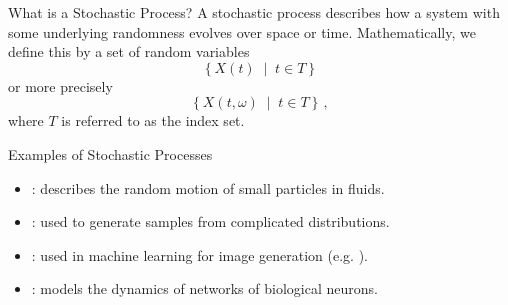 \documentclass[10pt]{beamer}
\begin{document}
\begin{frame}[fragile]{What is a Stochastic Process?}
A stochastic process describes how a system with some underlying randomness evolves over space or time. Mathematically, we define this by a set of random variables
\begin{equation*}
    \left\{X\left(t\right) \;\middle|\; t \in T\right\}
\end{equation*}
or more precisely
\begin{equation*}
    \left\{X\left(t, \omega\right) \;\middle|\; t \in T\right\}\,,
\end{equation*}
where \(T\) is referred to as the index set.\onslide<2->{

Very often, \(T\) is chosen to represent points in time. In discrete-time, we may have \(T = \mathbb{N}\), leading to a countably infinite set of random variables. In continuous-time, usually \(T = \left[0, \infty\right)\), producing an uncountably infinite set of random variables. Whether these random variables are independent or not is determined by the underlying process.}
\end{frame}

\begin{frame}[fragile]{Examples of Stochastic Processes}
\begin{itemize}[<+->]
    \item \href{https://en.wikipedia.org/wiki/Brownian_motion}{\color{mLightBrown}{Brownian motion}}: describes the random motion of small particles in fluids.
    \item \href{https://en.wikipedia.org/wiki/Markov_chain_Monte_Carlo}{\color{mLightBrown}{Markov chain Monte Carlo}}: used to generate samples from complicated distributions.
    \item \href{https://en.wikipedia.org/wiki/Diffusion_process}{\color{mLightBrown}{Diffusion processes}}: used in machine learning for image generation (e.g. \href{https://en.wikipedia.org/wiki/Stable_Diffusion}{\color{mLightBrown}{Stable Diffusion}}).
    \item \href{https://en.wikipedia.org/wiki/Galves%E2%80%93L%C3%B6cherbach_model}{\color{mLightBrown}{Galves–L\"ocherbach model}}: models the dynamics of networks of biological neurons.
\end{itemize}
\end{frame}
\end{document}
